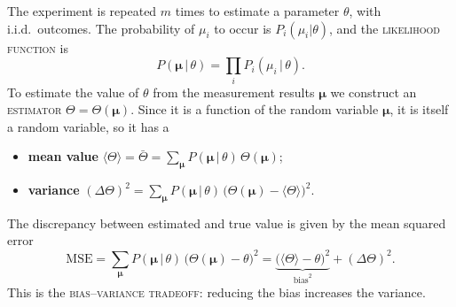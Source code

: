 \documentclass[11pt,a4paper]{article}
\newcommand{\expval}[1]{\langle #1\rangle}
\newcommand{\est}{\Theta}                 %
\newcommand{\vmu}{\bm{\mu}}               %
\newcommand{\Pmu}{P(\vmu\,|\,\theta)}
\newcommand{\term}[1]{\textsc{#1}}
\begin{document}
The experiment is repeated $m$ times to estimate a parameter $\theta$, with i.i.d.\ outcomes. The probability of $\mu_i$ to occur is $P_i(\mu_i|\theta)$, and the \term{likelihood function} is
\[
  \Pmu = \prod_i P_i(\mu_i\,|\,\theta).
\]
To estimate the value of $\theta$ from the measurement results $\vmu$ we construct an \term{estimator} $\est=\est(\vmu)$. Since it is a function of the random variable $\vmu$, it is itself a random variable, so it has a
\begin{itemize}
  \item \textbf{mean value} $\displaystyle \expval{\est} = \bar\est = \sum_{\vmu}\Pmu\,\est(\vmu)$;
  \item \textbf{variance} $\displaystyle (\Delta\est)^2 = \sum_{\vmu}\Pmu\,\bigl(\est(\vmu)-\expval{\est}\bigr)^2$.
\end{itemize}
The discrepancy between estimated and true value is given by the mean squared error
\[
  \text{MSE} = \sum_{\vmu}\Pmu\,\bigl(\est(\vmu)-\theta\bigr)^2
  = \underbrace{\bigl(\expval{\est}-\theta\bigr)^2}_{\text{bias}^2} + (\Delta\est)^2 .
\]
This is the \term{bias--variance tradeoff}: reducing the bias increases the variance.
\end{document}

